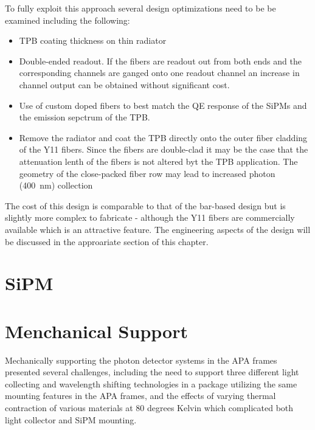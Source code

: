 To fully exploit this approach several design optimizations need to be
be examined including the following:

\begin{itemize}

\item{TPB coating thickness on thin radiator}

\item{Double-ended readout. If the fibers are readout out from both
  ends and the corresponding channels are ganged onto one readout
  channel an increase in channel output can be obtained without
  significant cost.}

\item{Use of custom doped fibers to best match the QE response of the
  SiPMs and the emission sepctrum of the TPB.}

\item{Remove the radiator and coat the TPB directly onto the outer
  fiber cladding of the Y11 fibers. Since the fibers are double-clad
  it may be the case that the attenuation lenth of the fibers is not
  altered byt the TPB application. The geometry of the close-packed
  fiber row may lead to increased photon (400~nm) collection}

\end{itemize}

The cost of this design is comparable to that of the bar-based design
but is slightly more complex to fabricate - although the Y11 fibers
are commercially available which is an attractive feature. The
engineering aspects of the design will be discussed in the approariate
section of this chapter. 

\section{SiPM}

\section{Menchanical Support}

Mechanically supporting the photon detector systems in the APA frames
presented several challenges, including the need to support three
different light collecting and wavelength shifting technologies in a
package utilizing the same mounting features in the APA frames, and
the effects of varying thermal contraction of various materials at 80
degrees Kelvin which complicated both light collector and SiPM
mounting.

